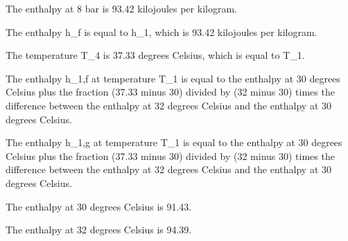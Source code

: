 The enthalpy at 8 bar is 93.42 kilojoules per kilogram.

The enthalpy h_f is equal to h_1, which is 93.42 kilojoules per kilogram.

The temperature T_4 is 37.33 degrees Celsius, which is equal to T_1.

The enthalpy h_1,f at temperature T_1 is equal to the enthalpy at 30 degrees Celsius plus the fraction (37.33 minus 30) divided by (32 minus 30) times the difference between the enthalpy at 32 degrees Celsius and the enthalpy at 30 degrees Celsius.

The enthalpy h_1,g at temperature T_1 is equal to the enthalpy at 30 degrees Celsius plus the fraction (37.33 minus 30) divided by (32 minus 30) times the difference between the enthalpy at 32 degrees Celsius and the enthalpy at 30 degrees Celsius.

The enthalpy at 30 degrees Celsius is 91.43.

The enthalpy at 32 degrees Celsius is 94.39.